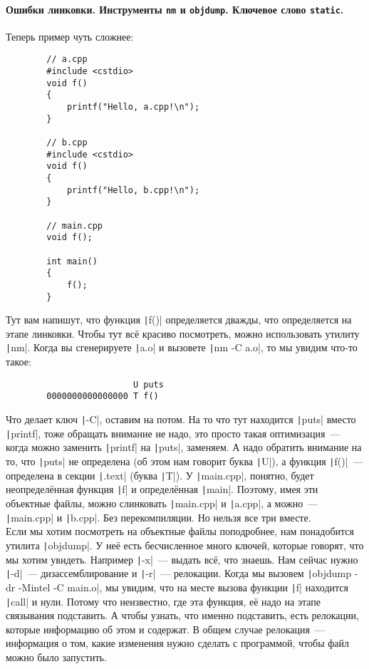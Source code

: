 \documentclass{article}
\begin{document}
    \paragraph{Ошибки линковки. Инструменты \texttt{nm} и \texttt{objdump}. Ключевое слово \texttt{static}.}
    Теперь пример чуть сложнее:
    \begin{verbatim}
        // a.cpp
        #include <cstdio>
        void f()
        {
            printf("Hello, a.cpp!\n");
        }

        // b.cpp
        #include <cstdio>
        void f()
        {
            printf("Hello, b.cpp!\n");
        }

        // main.cpp
        void f();

        int main()
        {
            f();
        }
    \end{verbatim}
    Тут вам напишут, что функция \texttt|f()| определяется дважды, что определяется на этапе линковки. Чтобы тут всё красиво посмотреть, можно использовать утилиту \texttt|nm|. Когда вы сгенерируете \texttt|a.o| и вызовете \texttt|nm -C a.o|, то мы увидим что-то такое:
    \begin{verbatim}
                         U puts
        0000000000000000 T f()
    \end{verbatim}
    Что делает ключ \texttt|-C|, оставим на потом. На то что тут находится \texttt|puts| вместо \texttt|printf|, тоже обращать внимание не надо, это просто такая оптимизация~--- когда можно заменить \texttt|printf| на \texttt|puts|, заменяем. А надо обратить внимание на то, что \texttt|puts| не определена (об этом нам говорит буква \texttt|U|), а функция \texttt|f()|~--- определена в секции \texttt|.text| (буква \texttt|T|). У \texttt|main.cpp|, понятно, будет неопределённая функция \texttt|f| и определённая \texttt|main|.
    Поэтому, имея эти объектные файлы, можно слинковать \texttt|main.cpp| и \texttt|a.cpp|, а можно~--- \texttt|main.cpp| и \texttt|b.cpp|. Без перекомпиляции. Но нельзя все три вместе.\\
    Если мы хотим посмотреть на объектные файлы поподробнее, нам понадобится утилита \texttt|objdump|. У неё есть бесчисленное много ключей, которые говорят, что мы хотим увидеть. Например \texttt|-x|~--- выдать всё, что знаешь. Нам сейчас нужно \texttt|-d|~--- дизассемблирование и \texttt|-r|~--- релокации. Когда мы вызовем \texttt|objdump -dr -Mintel -C main.o|, мы увидим, что на месте вызова функции \texttt|f| находится \texttt|call| и нули. Потому что неизвестно, где эта функция, её надо на этапе связывания подставить. А чтобы узнать, что именно подставить, есть релокации, которые информацию об этом и содержат. В общем случае релокация~--- информация о том, какие изменения нужно сделать с программой, чтобы файл можно было запустить.\\
\end{document}
